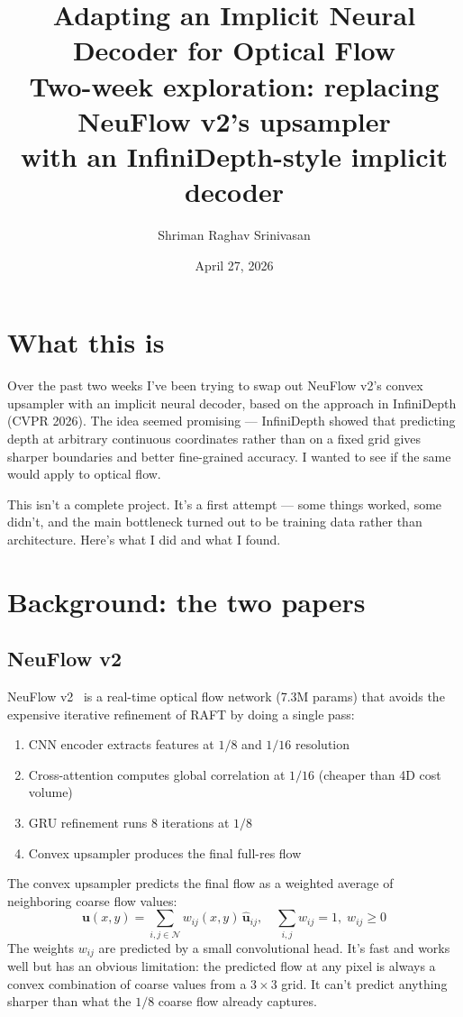 \documentclass[11pt,a4paper]{article}
\title{\textbf{Adapting an Implicit Neural Decoder for Optical Flow}\\[0.3em]
\large Two-week exploration: replacing NeuFlow v2's upsampler\\
with an InfiniDepth-style implicit decoder}
\author{Shriman Raghav Srinivasan}
\date{April 27, 2026}
\begin{document}
\maketitle\thispagestyle{fancy}

\section*{What this is}

Over the past two weeks I've been trying to swap out NeuFlow v2's convex upsampler with an implicit neural decoder, based on the approach in InfiniDepth (CVPR 2026). The idea seemed promising --- InfiniDepth showed that predicting depth at arbitrary continuous coordinates rather than on a fixed grid gives sharper boundaries and better fine-grained accuracy. I wanted to see if the same would apply to optical flow.

This isn't a complete project. It's a first attempt --- some things worked, some didn't, and the main bottleneck turned out to be training data rather than architecture. Here's what I did and what I found.

\section{Background: the two papers}

\subsection{NeuFlow v2}

NeuFlow v2~\cite{neuflowv2} is a real-time optical flow network (7.3M params) that avoids the expensive iterative refinement of RAFT by doing a single pass:
\begin{enumerate}[leftmargin=*,itemsep=1pt]
  \item CNN encoder extracts features at $1/8$ and $1/16$ resolution
  \item Cross-attention computes global correlation at $1/16$ (cheaper than 4D cost volume)
  \item GRU refinement runs 8 iterations at $1/8$
  \item Convex upsampler produces the final full-res flow
\end{enumerate}

The convex upsampler predicts the final flow as a weighted average of neighboring coarse flow values:
\[
  \mathbf{u}(x,y) = \sum_{i,j \in \mathcal{N}} w_{ij}(x,y)\,\hat{\mathbf{u}}_{ij}, \quad \sum_{i,j} w_{ij}=1,\; w_{ij}\ge 0
\]
The weights $w_{ij}$ are predicted by a small convolutional head. It's fast and works well but has an obvious limitation: the predicted flow at any pixel is always a convex combination of coarse values from a $3\times3$ grid. It can't predict anything sharper than what the $1/8$ coarse flow already captures.
\end{document}

